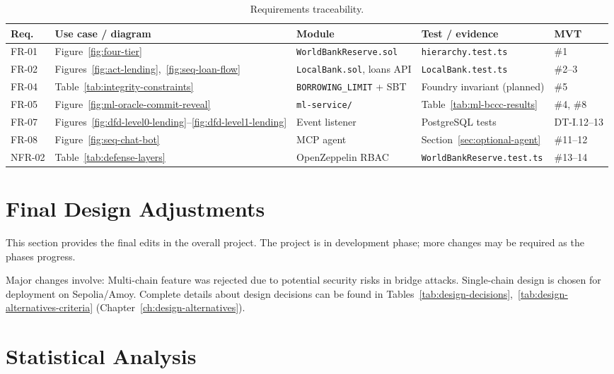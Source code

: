 \begin{table}[H]
\centering
\caption[Requirements traceability]{Requirements traceability.}
\label{tab:traceability}
\footnotesize
\begin{tabular}{@{}p{1.1cm}p{2.6cm}p{2.8cm}p{2.6cm}p{3.2cm}@{}}
\toprule
\tableheadcolor
\textbf{Req.} & \textbf{Use case / diagram} & \textbf{Module} & \textbf{Test / evidence} & \textbf{MVT} \\
\midrule
FR-01 & Figure~\ref{fig:four-tier} & \texttt{WorldBankReserve.sol} & \texttt{hierarchy.test.ts} & \#1 \\
FR-02 & Figures~\ref{fig:act-lending},~\ref{fig:seq-loan-flow} & \texttt{LocalBank.sol}, loans API & \texttt{LocalBank.test.ts} & \#2--3 \\
FR-04 & Table~\ref{tab:integrity-constraints} & \texttt{BORROWING\_LIMIT} + SBT & Foundry invariant (planned) & \#5 \\
FR-05 & Figure~\ref{fig:ml-oracle-commit-reveal} & \texttt{ml-service/} & Table~\ref{tab:ml-bccc-results} & \#4, \#8 \\
FR-07 & Figures~\ref{fig:dfd-level0-lending}--\ref{fig:dfd-level1-lending} & Event listener & PostgreSQL tests & DT-I.12--13 \\
FR-08 & Figure~\ref{fig:seq-chat-bot} & MCP agent & Section~\ref{sec:optional-agent} & \#11--12 \\
NFR-02 & Table~\ref{tab:defense-layers} & OpenZeppelin RBAC & \texttt{WorldBankReserve.test.ts} & \#13--14 \\
\bottomrule
\end{tabular}
\end{table}

\section{Final Design Adjustments}
\label{sec:final-design-adjustments}
\label{sec:bridge}

This section provides the final edits in the overall project. The project is in development phase; more changes may be required as the phases progress.

Major changes involve: Multi-chain feature was rejected due to potential security risks in bridge attacks. Single-chain design is chosen for deployment on Sepolia/Amoy. Complete details about design decisions can be found in Tables~\ref{tab:design-decisions},~\ref{tab:design-alternatives-criteria} (Chapter~\ref{ch:design-alternatives}).

\section{Statistical Analysis}
\label{sec:statistical-analysis}

